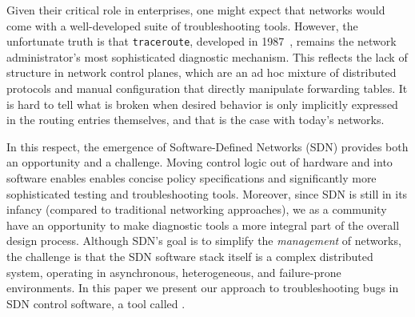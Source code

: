 
Given their critical role in enterprises, one might expect that networks
would come with a well-developed suite of troubleshooting tools. However,
the unfortunate truth is that {\tt traceroute}, developed in 1987~\cite{traceroute},
remains the network administrator's most sophisticated diagnostic mechanism. This reflects
the lack of structure in network control planes, which are an ad hoc mixture of
distributed protocols and manual configuration that directly manipulate forwarding tables. It is hard to tell what is broken
when desired behavior is only implicitly expressed in the routing entries themselves, and that is the case with today's networks.

In this respect, the emergence of Software-Defined
Networks (SDN) provides both an opportunity and a challenge. Moving control logic out of hardware and into software
enables enables concise policy specifications and significantly more sophisticated testing and troubleshooting tools. Moreover, since SDN
is still in its infancy (compared to traditional networking approaches), we as a community have an opportunity to make diagnostic tools
a more integral part of the overall design process. Although SDN's goal is to simplify the
{\em management} of networks, the challenge is that the SDN software stack itself is a complex distributed system,
operating in asynchronous, heterogeneous, and failure-prone environments.
In this paper we present our approach to troubleshooting bugs in SDN control
software, a tool called \projectname{}.

